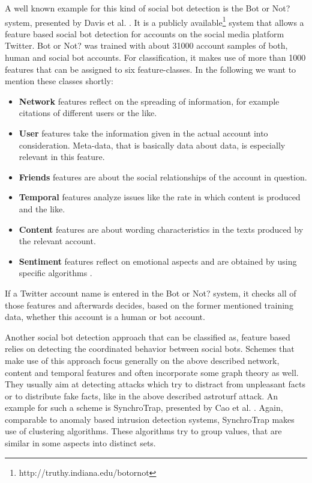 A well known example for this kind of social bot detection is the Bot or Not? system, presented by Davis et al. \cite{botornot}. It is a publicly available\footnote{http://truthy.indiana.edu/botornot} system that allows a feature based social bot detection for accounts on the social media platform Twitter. Bot or Not? was trained with about 31000 account samples of both, human and social bot accounts. For classification, it makes use of more than 1000 features that can be assigned to six feature-classes. In the following we want to mention these classes shortly:
\begin{itemize}
	\item \textbf{Network} features reflect on the spreading of information, for example citations of different users or the like.
	\item \textbf{User} features take the information given in the actual account into consideration. Meta-data, that is basically data about data, is especially relevant in this feature. 
	\item \textbf{Friends} features are about the social relationships of the account in question.
	\item \textbf{Temporal} features analyze issues like the rate in which content is produced and the like.
	\item \textbf{Content} features are about wording characteristics in the texts produced by the relevant account.
	\item \textbf{Sentiment} features reflect on emotional aspects and are obtained by using specific algorithms \cite{botornot}.
\end{itemize}  
If a Twitter account name is entered in the Bot or Not? system, it checks all of those features and afterwards decides, based on the former mentioned training data, whether this account is a human or bot account.

Another social bot detection approach that can be classified as, feature based relies on detecting the coordinated behavior between social bots. Schemes that make use of this approach focus generally on the above described network, content and temporal features and often incorporate some graph theory as well. They usually aim at detecting attacks which try to distract from unpleasant facts or to distribute fake facts, like in the above described astroturf attack.  An example for such a scheme is SynchroTrap, presented by Cao et al.  \cite{synchrotrap}. Again, comparable to anomaly based intrusion detection systems, SynchroTrap makes use of clustering algorithms. These algorithms try to group values, that are similar in some aspects into distinct sets. 


